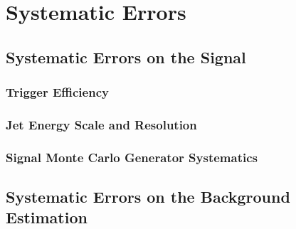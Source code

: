  

\chapter[Systematic Errors]{Systematic Errors}

\section{Systematic Errors on the Signal}
\subsection{Trigger Efficiency}
\subsection{Jet Energy Scale and Resolution}
\subsection{Signal Monte Carlo Generator Systematics}

\section{Systematic Errors on the Background Estimation}
